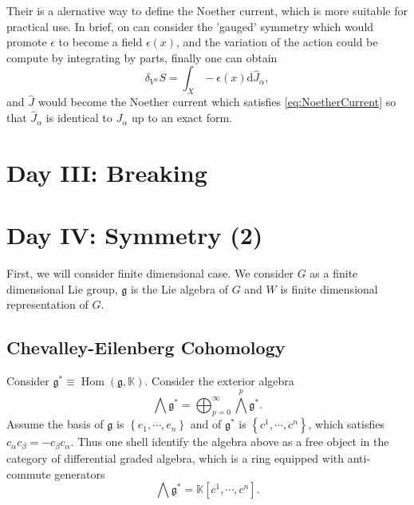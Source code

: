 \documentclass[10pt]{article}
\newcommand{\Hom}{\operatorname{Hom}}
\begin{document}
Their is a alernative way to define the Noether current, which is more suitable for practical use. In brief, on can consider the 'gauged' symmetry which would promote $ \epsilon$ to become a field $ \epsilon(x)$, and the variation of the action could be compute by integrating by parts, finally one can obtain
\begin{equation*}
  \delta_{V^{\alpha}} S = \int _{X} - \epsilon(x) \mathrm{d} \hat{J}_{\alpha},
\end{equation*}
and $ \hat{J}$ would become the Noether current which satisfies \eqref{eq:NoetherCurrent} so that $ \hat{J}_{\alpha}$ is identical to $ J_{\alpha}$ up to an exact form.

\section{Day III: Breaking}

\section{Day IV: Symmetry (2)}

First, we will consider finite dimensional case. We consider $ G$ as a finite dimensional Lie group, $ \mathfrak{g} $ is the Lie algebra of $ G$ and $ W$ is finite dimensional representation of $ G$.

\subsection{Chevalley-Eilenberg Cohomology}

Consider $ \mathfrak{g}^{*} \equiv \Hom(\mathfrak{g}, \mathbb{K})$. Consider the exterior algebra
\begin{equation*}
  \bigwedge \mathfrak{g}^{*} = \bigoplus_{p=0}^{\infty } \bigwedge^{p} \mathfrak{g}^{*}.
\end{equation*}
Assume the basis of $ \mathfrak{g}$ is $\left\{ e_1,\cdots ,e_{n} \right\}$ and of $ \mathfrak{g}^{*}$ is $\left\{ c^{1},\cdots ,c^{n} \right\}$, which satisfies $ c_{\alpha} c_{\beta} = - c_{\beta} c_{\alpha}$. Thus one shell identify the algebra above as a free object in the category of differential graded algebra, which is a ring equipped with anti-commute generators
\begin{equation*}
  \bigwedge \mathfrak{g}^{*} = \mathbb{K}[c^{1},\cdots ,c^{n}].
\end{equation*}
\end{document}
